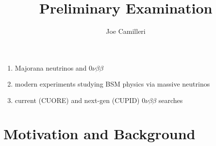 \documentclass{beamer}
\title[CUPID array]{Preliminary Examination} %
\author{Joe Camilleri} %
\institute[Virginia Tech] %
{
	Virginia Tech \\ %
	\medskip
	\medskip
}
\date{} %
\begin{document}
	\begin{frame}
		\titlepage %
	\end{frame}
	
	\begin{frame}
	\begin{enumerate}
	\item Majorana neutrinos and $0\nu\beta\beta$
	\item modern experiments studying BSM physics via massive neutrinos
	\item current (CUORE) and next-gen (CUPID) $0\nu\beta\beta$ searches
	\end{enumerate}
	\end{frame}
	
\section{Motivation and Background}
	
\end{document}
